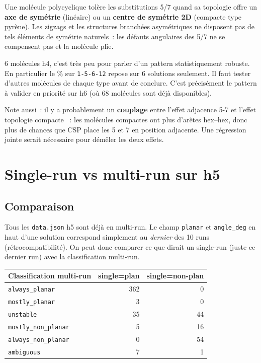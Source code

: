 \documentclass[11pt,a4paper]{article}
\begin{document}
\begin{hypothese}
Une molécule polycyclique tolère les substitutions 5/7 quand sa topologie offre un \textbf{axe de symétrie} (linéaire) ou un \textbf{centre de symétrie 2D} (compacte type pyrène). Les zigzags et les structures branchées asymétriques ne disposent pas de tels éléments de symétrie naturels~: les défauts angulaires des 5/7 ne se compensent pas et la molécule plie.
\end{hypothese}

\begin{limite}
6 molécules h4, c'est très peu pour parler d'un pattern statistiquement robuste. En particulier le \% \fg{} sur \texttt{1-5-6-12} repose sur 6 solutions seulement. Il faut tester d'autres molécules de chaque type avant de conclure. C'est précisément le pattern à valider en priorité sur h6 (où 68 molécules sont déjà disponibles).

Note aussi~: il y a probablement un \textbf{couplage} entre l'effet \og adjacence 5-7 \fg{} et l'effet \og topologie compacte \fg{}~: les molécules compactes ont plus d'arêtes hex--hex, donc plus de chances que CSP place les 5 et 7 en position adjacente. Une régression jointe serait nécessaire pour démêler les deux effets.
\end{limite}

\section{Single-run vs multi-run sur h5}

\subsection{Comparaison}

Tous les \texttt{data.json} h5 sont déjà en multi-run. Le champ \texttt{planar} et \texttt{angle\_deg} en haut d'une solution correspond simplement au \emph{dernier} des 10 runs (rétrocompatibilité). On peut donc comparer ce que dirait un \og single-run \fg{} (juste ce dernier run) avec la classification multi-run.

\begin{center}
\begin{tabular}{@{}lrr@{}}
\toprule
\textbf{Classification multi-run} & \textbf{single=plan} & \textbf{single=non-plan} \\
\midrule
\texttt{always\_planar}      & 362 & 0  \\
\texttt{mostly\_planar}      &   3 & 0  \\
\texttt{unstable}            &  35 & 44 \\
\texttt{mostly\_non\_planar} &   5 & 16 \\
\texttt{always\_non\_planar} &   0 & 54 \\
\texttt{ambiguous}           &   7 & 1  \\
\bottomrule
\end{tabular}
\end{center}
\end{document}
